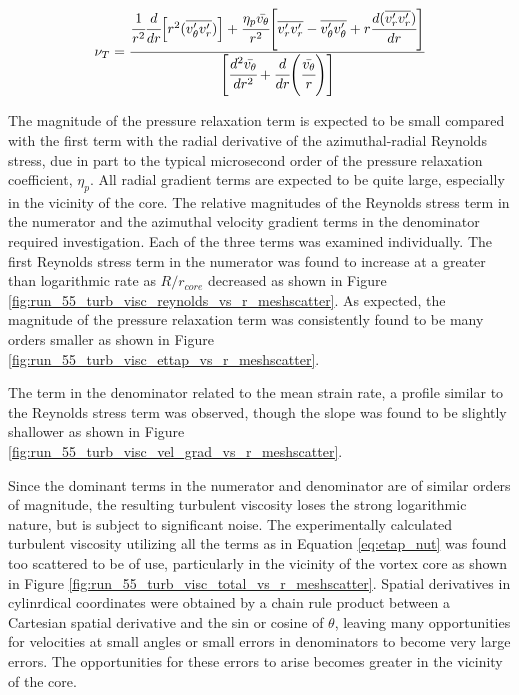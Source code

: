 \begin{equation}
\nu_T =
    \cfrac{\cfrac{1}{r^2}\cfrac{d}{dr}\Big[r^2 (\overline{v_{\theta}^\prime 
    v_{r}^\prime})\Big] +
	\cfrac{\eta_p \bar{v_\theta}}{r^2}\Bigg[\overline{v_{r}^\prime 
	v_{r}^\prime} - 
	\overline{v_{\theta}^\prime v_{\theta}^\prime} + 
	r \cfrac{d(\overline{v_{r}^\prime 
	v_{r}^\prime})}{dr}\Bigg]} {\Bigg[\cfrac{d^2 \bar{v_{\theta}}}{dr^2} + 
	\cfrac{d}{dr}
	\Bigg(\cfrac{\bar{v_{\theta}}}{r}\Bigg)\Bigg]}
\label{eq:etap_nut}
\end{equation}

\noindent
The magnitude of the pressure relaxation term is expected to be small compared 
with the first term with the radial derivative of the azimuthal-radial Reynolds 
stress, due in part to the typical microsecond order of the pressure relaxation 
coefficient, $\eta_p$. All radial gradient terms are expected to be quite 
large, especially in the vicinity of the core. The relative magnitudes of the 
Reynolds stress term in the numerator and the azimuthal velocity gradient terms 
in the denominator required investigation. Each of the three 
terms was examined individually. The first Reynolds stress term in the 
numerator was found to increase at a greater than logarithmic rate as 
$R/r_{core}$ decreased as shown in Figure 
\ref{fig:run_55_turb_visc_reynolds_vs_r_meshscatter}. As expected, the 
magnitude of the pressure relaxation term was consistently found to be many 
orders smaller as shown in Figure 
\ref{fig:run_55_turb_visc_ettap_vs_r_meshscatter}.

\vspace{32pt}



The term in the denominator related to the mean strain rate, a profile similar 
to the Reynolds stress term was observed, 
though the slope was found to be slightly shallower as shown in Figure 
\ref{fig:run_55_turb_visc_vel_grad_vs_r_meshscatter}.

\vspace{32pt}



Since the dominant terms in the numerator and denominator are of similar orders 
of magnitude, the resulting turbulent viscosity loses the strong logarithmic 
nature, but is subject to significant noise. The experimentally 
calculated turbulent viscosity utilizing all the terms as in Equation 
\ref{eq:etap_nut} was found too scattered to be of use, particularly in the 
vicinity of the vortex core as shown in Figure 
\ref{fig:run_55_turb_visc_total_vs_r_meshscatter}. Spatial derivatives in 
cylinrdical coordinates were obtained by a chain rule product between a 
Cartesian spatial derivative and the sin or cosine of $\theta$, leaving many 
opportunities for velocities at small angles or small errors in denominators to 
become very large errors. The opportunities for these errors to arise becomes 
greater in the vicinity of the core.


